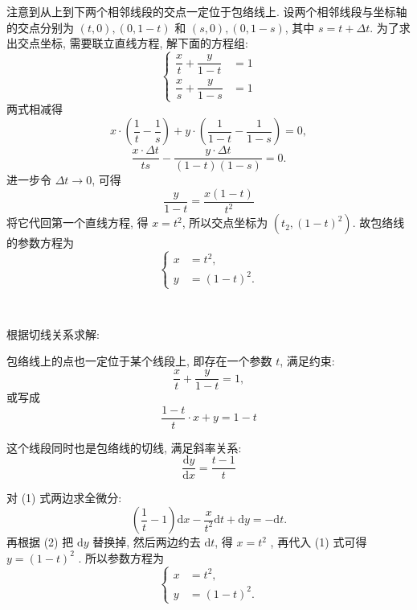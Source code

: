 注意到从上到下两个相邻线段的交点一定位于包络线上. 设两个相邻线段与坐标轴的交点分别为 $(t,0), (0,1-t)$ 和 $(s, 0), (0, 1-s)$, 其中 $s = t+\Delta t$. 为了求出交点坐标, 需要联立直线方程, 解下面的方程组:
\[ \begin{cases}
\dfrac{x}{t} + \dfrac{y}{1-t} &= 1 \\
\dfrac{x}{s} + \dfrac{y}{1-s} &= 1
\end{cases}\]
两式相减得 
\[ x\cdot\left(\frac{1}{t} - \frac{1}{s}\right) + y\cdot \left(\frac{1}{1-t} - \frac{1}{1-s}\right) = 0,\]
\[\frac{x\cdot\Delta t}{ts} - \frac{y\cdot \Delta t}{(1-t)(1-s)} = 0 .\]
进一步令 $\Delta t \to 0$, 可得
\[ \frac{y}{1-t} = \frac{x(1-t)}{t^2} \]
将它代回第一个直线方程, 得 $x = t^2$, 所以交点坐标为 $(t_2, (1-t)^2)$. 故包络线的参数方程为
\[ \begin{cases}
x &= t^2, \\
y &= (1-t)^2 .
\end{cases}\]


~

\noindent 根据切线关系求解:
\begin{figure*}[htbp]
\centering
{}
\end{figure*}

包络线上的点也一定位于某个线段上, 即存在一个参数 $t$, 满足约束:
\[ \frac{x}{t}+\frac{y}{1-t} = 1 ,\]
或写成
\[ \frac{1-t}{t}\cdot x + y = 1-t \tag{1}\]

这个线段同时也是包络线的切线, 满足斜率关系:
\[ \frac{\mathrm{d}y}{\mathrm{d}x} = \frac{t-1}{t} \tag{2} \]

对 (1) 式两边求全微分:
\[ (\frac{1}{t}-1)\mathrm{d}x - \frac{x}{t^2}\mathrm{d}t  + \mathrm{d} y = -\mathrm{d}t .\]
再根据 (2) 把 $\mathrm{d}y$ 替换掉, 然后两边约去 $\mathrm{d}t$, 得 $ x = t^2$ , 再代入 (1) 式可得 $ y = (1-t)^2 $ .
所以参数方程为
\[ \begin{cases}
x &= t^2, \\
y &= (1-t)^2 .
\end{cases}\]

